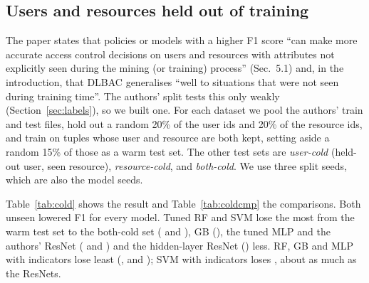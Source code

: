 \documentclass[11pt,a4paper]{article}
\begin{document}
\subsection{Users and resources held out of training}
The paper states that policies or models with a higher F1 score ``can make more accurate access control decisions on users and resources with attributes not explicitly seen during the mining (or training) process'' (Sec.~5.1) and, in the introduction, that DLBAC generalises ``well to situations that were not seen during training time''. The authors' split tests this only weakly (Section~\ref{sec:labels}), so we built one. For each dataset we pool the authors' train and test files, hold out a random 20\% of the user ids and 20\% of the resource ids, and train on tuples whose user and resource are both kept, setting aside a random 15\% of those as a warm test set. The other test sets are \emph{user-cold} (held-out user, seen resource), \emph{resource-cold}, and \emph{both-cold}. We use three split seeds, which are also the model seeds.

\begin{table}[t]
\centering\footnotesize

\caption{F1 on the hold-out splits (mean over eight datasets and three split seeds). Compare models within a column. A model's drop between columns reflects the entities and also the different tuples in each set, so compare drops across models rather than reading one drop as the effect of unseen entities.}
\label{tab:cold}
\end{table}

Table~\ref{tab:cold} shows the result and Table~\ref{tab:coldcmp} the comparisons. Both unseen lowered F1 for every model. Tuned RF and SVM lose the most from the warm test set to the both-cold set (\dropRfTuned{} and \dropSvmTuned{}), GB (\dropGbTuned{}), the tuned MLP and the authors' ResNet (\dropMlpTuned{} and \dropResnet{}) and the hidden-layer ResNet (\dropResnetHead{}) less. RF, GB and MLP with indicators lose least (\dropRfTunedEq{}, \dropGbTunedEq{} and \dropMlpTunedEq{}); SVM with indicators loses \dropSvmTunedEq{}, about as much as the ResNets.

\begin{table}[t]
\centering\footnotesize

\caption{Differences in F1 on the hold-out splits (mean over eight datasets and three split seeds). In brackets: the paired $t$-test $p$ over the datasets.}
\label{tab:coldcmp}
\end{table}
\end{document}
